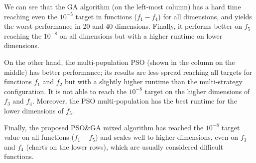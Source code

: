 \documentclass[runningheads]{llncs}
\begin{document}
We can see that the GA algorithm (on the left-most column) has a hard time reaching even the
$10^{-5}$ target in functions ($f_1-f_4$) for all dimensions, and yields the worst
performance in 20 and 40 dimensions. Finally, it performs better on $f_5$
reaching the $10^{-8}$ on all dimensions but with a higher runtime on lower
dimensions. %

On the other hand, the multi-population PSO (shown in the column on the middle)
has better performance; its results are less spread
reaching all targets for functions $f_1$ and $f_2$ but with a slightly higher
runtime than the multi-strategy configuration. It is not able to reach the
$10^{-8}$ target on the higher dimensions of $f_3$ and $f_4$. Moreover, the PSO
multi-population has the best runtime for the lower dimensions of $f_5$.

Finally, the proposed PSO\&GA mixed algorithm has reached the $10^{-8}$ target
value on all functions ($f_1-f_5$) and scales well to higher dimensions, even
on $f_3$ and $f_4$ (charts on the lower rows), which are usually
considered difficult functions. %
\end{document}
